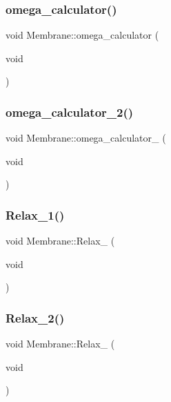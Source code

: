 \mbox{\label{classMembrane_a72796df96d3748c43543f10b85d26145}} 
\subsubsection{\texorpdfstring{omega\_calculator()}{omega\_calculator()}}
{\footnotesize\ttfamily void Membrane\+::omega\+\_\+calculator (\begin{DoxyParamCaption}\item[{void}]{ }\end{DoxyParamCaption})}

\mbox{\label{classMembrane_a2877e319db184da4fb5294d372400fa0}} 
\subsubsection{\texorpdfstring{omega\_calculator\_2()}{omega\_calculator\_2()}}
{\footnotesize\ttfamily void Membrane\+::omega\+\_\+calculator\+\_ (\begin{DoxyParamCaption}\item[{void}]{ }\end{DoxyParamCaption})}

\mbox{\label{classMembrane_a61d5561da6e815e1b75ac971121fdd28}} 
\subsubsection{\texorpdfstring{Relax\_1()}{Relax\_1()}}
{\footnotesize\ttfamily void Membrane\+::\+Relax\+\_ (\begin{DoxyParamCaption}\item[{void}]{ }\end{DoxyParamCaption})}

\mbox{\label{classMembrane_ad9b20c6a4e11da731a7981e47b7e35c5}} 
\subsubsection{\texorpdfstring{Relax\_2()}{Relax\_2()}}
{\footnotesize\ttfamily void Membrane\+::\+Relax\+\_ (\begin{DoxyParamCaption}\item[{void}]{ }\end{DoxyParamCaption})}

